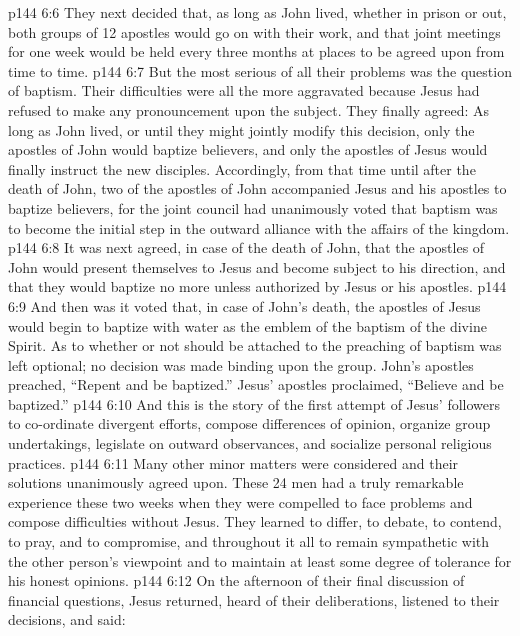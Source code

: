 \vs p144 6:6 They next decided that, as long as John lived, whether in prison or out, both groups of 12 apostles would go on with their work, and that joint meetings for one week would be held every three months at places to be agreed upon from time to time.
\vs p144 6:7 But the most serious of all their problems was the question of baptism. Their difficulties were all the more aggravated because Jesus had refused to make any pronouncement upon the subject. They finally agreed: As long as John lived, or until they might jointly modify this decision, only the apostles of John would baptize believers, and only the apostles of Jesus would finally instruct the new disciples. Accordingly, from that time until after the death of John, two of the apostles of John accompanied Jesus and his apostles to baptize believers, for the joint council had unanimously voted that baptism was to become the initial step in the outward alliance with the affairs of the kingdom.
\vs p144 6:8 It was next agreed, in case of the death of John, that the apostles of John would present themselves to Jesus and become subject to his direction, and that they would baptize no more unless authorized by Jesus or his apostles.
\vs p144 6:9 And then was it voted that, in case of John’s death, the apostles of Jesus would begin to baptize with water as the emblem of the baptism of the divine Spirit. As to whether or not  should be attached to the preaching of baptism was left optional; no decision was made binding upon the group. John’s apostles preached, “Repent and be baptized.” Jesus’ apostles proclaimed, “Believe and be baptized.”
\vs p144 6:10 \pc And this is the story of the first attempt of Jesus’ followers to co\hyp{}ordinate divergent efforts, compose differences of opinion, organize group undertakings, legislate on outward observances, and socialize personal religious practices.
\vs p144 6:11 Many other minor matters were considered and their solutions unanimously agreed upon. These 24 men had a truly remarkable experience these two weeks when they were compelled to face problems and compose difficulties without Jesus. They learned to differ, to debate, to contend, to pray, and to compromise, and throughout it all to remain sympathetic with the other person’s viewpoint and to maintain at least some degree of tolerance for his honest opinions.
\vs p144 6:12 \pc On the afternoon of their final discussion of financial questions, Jesus returned, heard of their deliberations, listened to their decisions, and said: 
